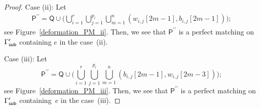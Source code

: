 \documentclass[11pt]{article}
\numberwithin{equation}{section}
\numberwithin{equation}{section}
\numberwithin{figure}{section}
\numberwithin{table}{section}
\newcommand{\sfP}{\mathsf{P}}
\newcommand{\sfQ}{\mathsf{Q}}
\begin{document}
\begin{proof}
Case (ii): Let \begin{gather*}%
\sfP^{\prime\prime}=\sfQ \cup \bigg(\bigcup_{i=1}^r \bigcup_{j=1}^{p_i} \bigcup_{m=1}^n(w_{i,j}[2m-1],b_{i,j}[2m-1])\bigg);
\end{gather*}
see Figure~\ref{deformation_PM_ii}. Then, we see that $\sfP^{\prime\prime}$ is a perfect matching on $\Gamma^\prime_{\sf sub}$ containing $e$ in the case~(ii).

Case (iii): Let \begin{displaymath}
\sfP^{\prime\prime}=\sfQ \cup \bigg(\bigcup_{i=1}^r \bigcup_{j=1}^{p_i} \bigcup_{m=1}^n(b_{i,j}[2m-1],w_{i,j}[2m-3])\bigg); \end{displaymath}
see Figure~\ref{deformation_PM_iii}. Then, we see that $\sfP^{\prime\prime}$ is a perfect matching on $\Gamma^\prime_{\sf sub}$ containing~$e$ in the case~(iii).


\end{proof}
\end{document}
